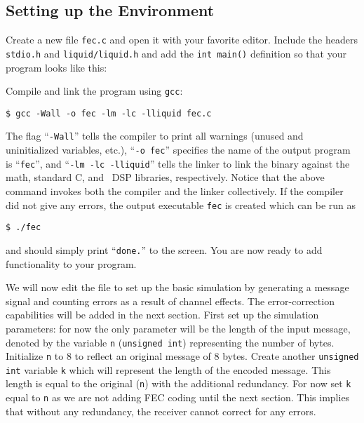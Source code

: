 \subsection{Setting up the Environment}
\label{tutorial:fec:environment}

Create a new file {\tt fec.c} and open it with your favorite editor.
Include the headers {\tt stdio.h} and {\tt liquid/liquid.h}
and add the {\tt int main()} definition
so that your program looks like this:
%

%
Compile and link the program using {\tt gcc}:
%
\begin{Verbatim}[fontsize=\small]
    $ gcc -Wall -o fec -lm -lc -lliquid fec.c
\end{Verbatim}
%
The flag ``{\tt -Wall}'' tells the compiler to print all warnings
(unused and uninitialized variables, etc.),
``{\tt -o fec}'' specifies the name of the output program is
``{\tt fec}'', and
``{\tt -lm -lc -lliquid}'' tells the linker to link the binary against
the math, standard C, and \liquid\ DSP libraries, respectively.
Notice that the above command invokes both the compiler and the linker
collectively.
%
If the compiler did not give any errors, the output executable {\tt fec}
is created which can be run as
\begin{Verbatim}[fontsize=\small]
    $ ./fec
\end{Verbatim}
%
and should simply print ``{\tt done.}'' to the screen.
You are now ready to add functionality to your program.

We will now edit the file to set up the basic simulation by generating a
message signal and counting errors as a result of channel effects.
The error-correction capabilities will be added in the next section.
First set up the simulation parameters: for now the only parameter will
be the length of the input message, denoted by the variable {\tt n}
({\tt unsigned int}) representing the number of bytes.
Initialize {\tt n} to 8 to reflect an original message of 8 bytes.
Create another {\tt unsigned int} variable {\tt k} which will represent
the length of the encoded message.
This length is equal to the original ({\tt n}) with the additional
redundancy.
For now set {\tt k} equal to {\tt n} as we are not adding FEC coding
until the next section.
This implies that without any redundancy, the receiver cannot correct
for any errors.


